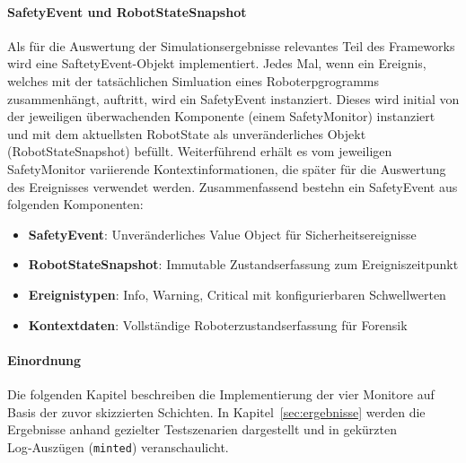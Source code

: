\paragraph{SafetyEvent und RobotStateSnapshot}
Als für die Auswertung der Simulationsergebnisse relevantes Teil des Frameworks
wird eine SaftetyEvent-Objekt implementiert. Jedes Mal, wenn ein Ereignis,
welches mit der tatsächlichen Simluation eines Roboterpgrogramms zusammenhängt,
auftritt, wird ein SafetyEvent instanziert. Dieses wird initial von der
jeweiligen überwachenden Komponente (einem SafetyMonitor) instanziert und mit
dem aktuellsten RobotState als unveränderliches Objekt (RobotStateSnapshot) befüllt.
Weiterführend erhält es vom jeweiligen SafetyMonitor variierende
Kontextinformationen, die später für die Auswertung des Ereignisses verwendet
werden. Zusammenfassend bestehn ein SafetyEvent aus folgenden Komponenten:
\begin{itemize}
	\item \textbf{SafetyEvent}: Unveränderliches Value Object für Sicherheitsereignisse
	\item \textbf{RobotStateSnapshot}: Immutable Zustandserfassung zum Ereigniszeitpunkt
	\item \textbf{Ereignistypen}: Info, Warning, Critical mit konfigurierbaren Schwellwerten
	\item \textbf{Kontextdaten}: Vollständige Roboterzustandserfassung für Forensik
\end{itemize}

\paragraph{Einordnung}
Die folgenden Kapitel beschreiben die Implementierung der vier Monitore auf Basis
der zuvor skizzierten Schichten. In Kapitel~\ref{sec:ergebnisse} werden die
Ergebnisse anhand gezielter Testszenarien dargestellt und in gekürzten
Log‑Auszügen (\texttt{minted}) veranschaulicht.
